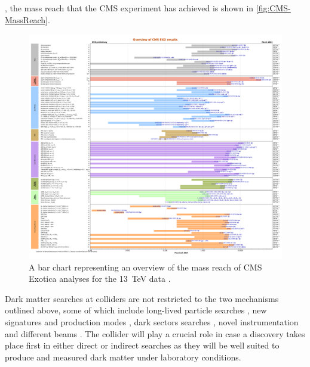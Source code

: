 , the mass reach that the CMS experiment has achieved is shown in \autoref{fig:CMS-MassReach}. 
\begin{figure}[ht!]
    \centering
    \includegraphics[width=0.9\linewidth]{figures/DMOverview/CurrentBarChartVersion_v14.pdf}
    \caption[A bar chart representing an overview of the mass reach of CMS analyses.]{A bar chart representing an overview of the mass reach of CMS Exotica analyses for the 13~TeV data \cite{CMS-MassReach}.}
    \label{fig:CMS-MassReach}
\end{figure}
\fi

Dark matter searches at colliders are not restricted to the two mechanisms outlined above, some of which include long-lived particle searches \cite{Mitsou:2021tti}, new signatures and production modes \cite{Dienes:2021cxr,tcarter:thesis}, dark sectors searches \cite{Cohen:2017pzm,ajaspan:thesis}, novel instrumentation and different beams \cite{Feng:2017uoz,Batell:2014mga}. The collider will play a crucial role in case a discovery takes place first in either direct or indirect searches as they will be well suited to produce and measured dark matter under laboratory conditions.

